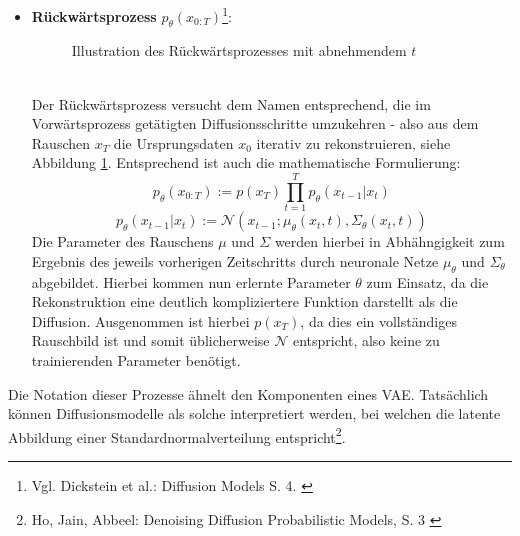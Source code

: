 \begin{itemize}
    \item \textbf{Rückwärtsprozess} $p_\theta(x_{0:T})$\footnote{
        Vgl. Dickstein et al.: Diffusion Models S. 4. 
        \cite{pmlr-v37-sohl-dickstein15}
    }: \\
    \begin{figure}[htbp]
        \centering
        \caption{Illustration des Rückwärtsprozesses mit abnehmendem $t$}
        \label{fig:reverse_process}
    \end{figure} \\
    Der Rückwärtsprozess versucht dem Namen entsprechend, die im Vorwärtsprozess getätigten Diffusionsschritte umzukehren - also aus dem Rauschen $x_T$ die Ursprungsdaten $x_0$ iterativ zu rekonstruieren, siehe Abbildung \ref{fig:reverse_process}. Entsprechend ist auch die mathematische Formulierung:
    \begin{equation}
        p_\theta(x_{0:T}) := p(x_T) \prod_{t=1}^T p_\theta(x_{t-1} | x_{t}) 
    \end{equation}
    \begin{equation}
        p_\theta(x_{t-1} | x_{t})  :=  
        \mathcal N(x_{t-1}; \mu_\theta(x_{t}, t), \Sigma_\theta(x_{t}, t))
    \end{equation}
    Die Parameter des Rauschens $\mu$ und $\Sigma$ werden hierbei in Abhähngigkeit zum Ergebnis des jeweils vorherigen Zeitschritts durch neuronale Netze $\mu_\theta$ und $\Sigma_\theta$ abgebildet. Hierbei kommen nun erlernte Parameter $\theta$ zum Einsatz, da die Rekonstruktion eine deutlich kompliziertere Funktion darstellt als die Diffusion. Ausgenommen ist hierbei $p(x_T)$, da dies ein vollständiges Rauschbild ist und somit üblicherweise $\mathcal N$ entspricht, also keine zu trainierenden Parameter benötigt.
\end{itemize}
Die Notation dieser Prozesse ähnelt den Komponenten eines \ac{VAE}. Tatsächlich können Diffusionsmodelle als solche interpretiert werden, bei welchen die latente Abbildung einer Standardnormalverteilung entspricht\footnote{
    Ho, Jain, Abbeel: Denoising Diffusion Probabilistic Models, S. 3
    \cite{ho2020denoisingdiffusionprobabilisticmodels}
}.
